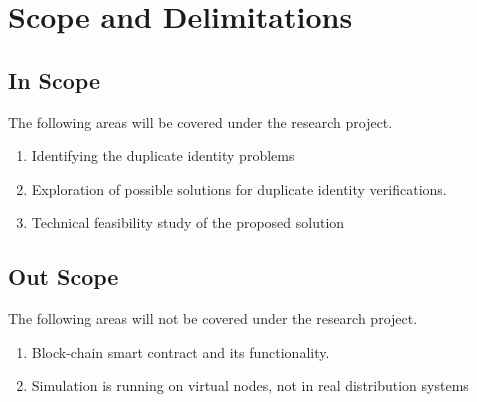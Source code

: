\section{Scope and Delimitations}

\subsection{In Scope}
The following areas will be covered under the research project.

\begin{enumerate}
    \item Identifying the duplicate identity problems
    \item Exploration of possible solutions for duplicate identity verifications.
    \item Technical feasibility study of the proposed solution    
\end{enumerate}


\subsection{Out Scope}

The following areas will not be covered under the research project.

\begin{enumerate}
    \item Block-chain smart contract and its functionality. 
    \item Simulation is running on virtual nodes, not in real distribution systems 
\end{enumerate}
